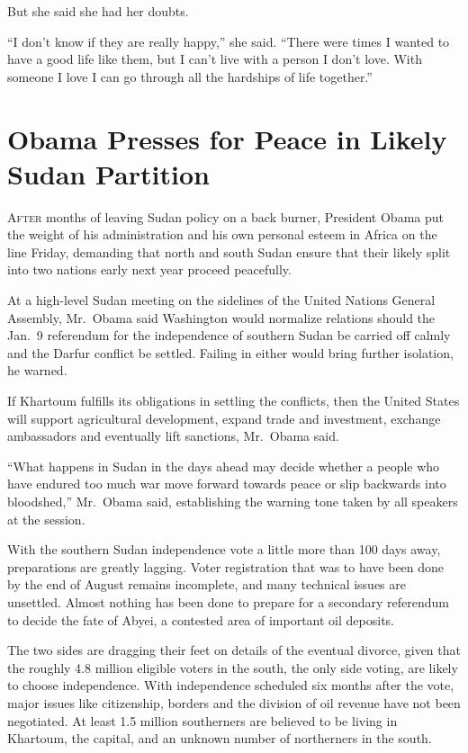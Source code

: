 ﻿\documentclass[12pt]{article}
\begin{document}
But she said she had her doubts.

``I don't know if they are really happy,'' she said. ``There were times I wanted to have a good life
like them, but I can't live with a person I don't love. With someone I love I can go through all the
hardships of life together.''

\pagebreak
\section{Obama Presses for Peace in Likely Sudan Partition}

\lettrine{A}{fter} months of leaving Sudan policy on a back burner,
President Obama put the weight of his administration and his own personal esteem in Africa on the
line Friday, demanding that north and south Sudan ensure that their likely split into two nations
early next year proceed peacefully.

At a high-level Sudan meeting on the sidelines of the United Nations General Assembly, Mr.~Obama
said Washington would normalize relations should the Jan.~9 referendum for the independence of
southern Sudan be carried off calmly and the Darfur conflict be settled. Failing in either would
bring further isolation, he warned.

If Khartoum fulfills its obligations in settling the conflicts, then the United States will support
agricultural development, expand trade and investment, exchange ambassadors and eventually lift
sanctions, Mr.~Obama said.

``What happens in Sudan in the days ahead may decide whether a people who have endured too much war
move forward towards peace or slip backwards into bloodshed,'' Mr.~Obama said, establishing the
warning tone taken by all speakers at the session.

With the southern Sudan independence vote a little more than 100 days away, preparations are greatly
lagging. Voter registration that was to have been done by the end of August remains incomplete, and
many technical issues are unsettled. Almost nothing has been done to prepare for a secondary
referendum to decide the fate of Abyei, a contested area of important oil deposits.

The two sides are dragging their feet on details of the eventual divorce, given that the roughly 4.8
million eligible voters in the south, the only side voting, are likely to choose independence. With
independence scheduled six months after the vote, major issues like citizenship, borders and the
division of oil revenue have not been negotiated. At least 1.5 million southerners are believed to
be living in Khartoum, the capital, and an unknown number of northerners in the south.
\end{document}
